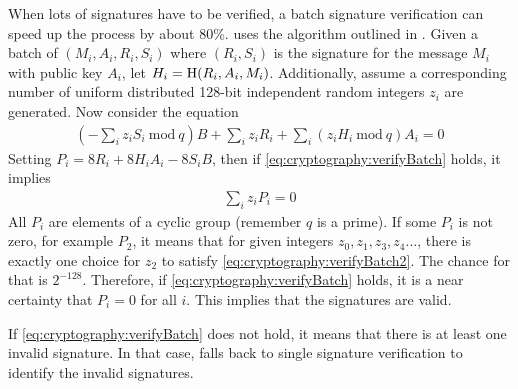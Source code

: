 When lots of signatures have to be verified, a batch signature verification can speed up the process by about 80\%.
\codenamespace uses the algorithm outlined in \cite{Bernstein2011}.
Given a batch of $(M_i, A_i, R_i, S_i)$ where $(R_i, S_i)$ is the signature for the message $M_i$ with public key $A_i$,
let $H_i = \operatorname{H}(R_i, A_i, M_i)$.
Additionally, assume a corresponding number of uniform distributed 128-bit independent random integers $z_i$ are generated.
Now consider the equation
\begin{align}
\left(-\sum_i{z_i S_i \: \mathrm{mod} \: q}\right)B + \sum_i{z_i R_i} + \sum_i{(z_i H_i \: \mathrm{mod} \: q)A_i = 0} \label{eq:cryptography:verifyBatch}
\end{align}
Setting $P_i = 8 R_i + 8 H_i A_i - 8 S_i B$, then if \eqref{eq:cryptography:verifyBatch} holds, it implies
\begin{align}
\sum_i{z_i P_i} = 0 \label{eq:cryptography:verifyBatch2}
\end{align}
All $P_i$ are elements of a cyclic group (remember $q$ is a prime).
If some $P_i$ is not zero, for example $P_2$, it means that for given integers $z_0, z_1, z_3, z_4 ...$, there is exactly one choice for $z_2$ to satisfy \eqref{eq:cryptography:verifyBatch2}.
The chance for that is $2^{-128}$.
Therefore, if \eqref{eq:cryptography:verifyBatch} holds, it is a near certainty that $P_i = 0$ for all $i$.
This implies that the signatures are valid.

If \eqref{eq:cryptography:verifyBatch} does not hold, it means that there is at least one invalid signature.
In that case, \codenamespace falls back to single signature verification to identify the invalid signatures.
